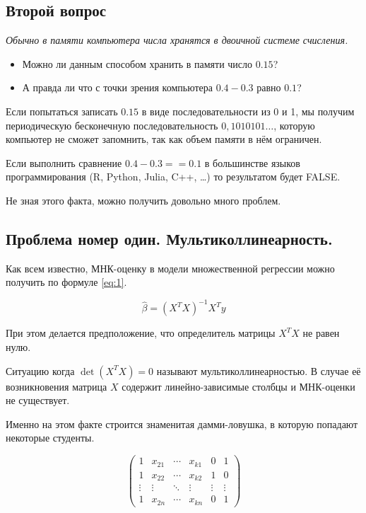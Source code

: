 \documentclass[12pt, a4paper]{article}
\begin{document}
\subsection{Второй вопрос}

\textit{
Обычно в памяти компьютера числа хранятся в двоичной системе счисления.}
\begin{itemize}
\item Можно ли данным способом хранить в памяти число $0.15$?
\item А правда ли что с точки зрения компьютера $0.4 - 0.3$ равно $0.1$?

\end{itemize}

Если попытаться записать $0.15$ в виде последовательности из 0 и 1, мы получим периодическую бесконечную последовательность $0,1010101 \dots$, которую компьютер не сможет запомнить, так как объем памяти в нём ограничен.

Если выполнить сравнение $0.4 - 0.3 == 0.1$ в большинстве языков программирования (R, Python, Julia, C++, \ldots) то результатом будет FALSE.

Не зная этого факта, можно получить довольно много проблем.

\subsection{Проблема номер один. Мультиколлинеарность.}

Как всем известно, МНК-оценку в модели множественной регрессии можно получить по формуле \eqref{eq:1}.


\[ \hat \beta = (X^T X)^{-1} X^T y \label{eq:1} \] 

При этом делается предположение, что определитель матрицы $X^T X$ не равен нулю. 

Ситуацию когда $\det (X^T X) = 0$ называют мультиколлинеарностью. В случае её возникновения матрица  $X$ содержит линейно-зависимые столбцы и МНК-оценки не существует. 

Именно на этом факте строится знаменитая дамми-ловушка, в которую попадают некоторые студенты.


\begin{equation} \label{eq:2} 
 \begin{pmatrix}
  1    & x_{21}    & \cdots  & x_{k1}  & 0      & 1      \\
  1    & x_{22}    & \cdots  & x_{k2}  & 1      & 0      \\
\vdots & \vdots    & \ddots  & \vdots  & \vdots & \vdots \\
  1    & x_{2n}    & \cdots  & x_{kn}  &0       & 1   
 \end{pmatrix}
\end{equation}
\end{document}
